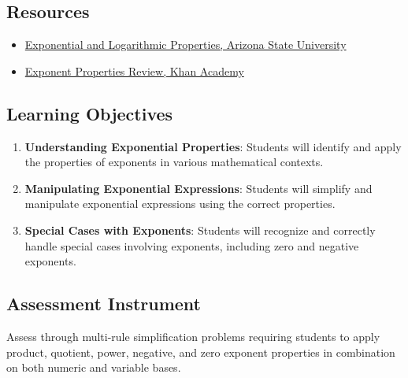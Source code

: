 \subsection{Resources}
\label{sss:reso-55b5}

\begin{itemize}
    \item \href{https://tutoring.asu.edu/sites/default/files/exponentialandlogrithmicproperties.pdf}{Exponential and Logarithmic Properties, Arizona State University}
    \item \href{https://www.khanacademy.org/math/cc-eighth-grade-math/cc-8th-numbers-operations/cc-8th-exponent-properties/a/exponent-properties-review}{Exponent Properties Review, Khan Academy}
\end{itemize}

\subsection{Learning Objectives}
\label{ssec:lear-29e5}

\begin{enumerate}
    \item \textbf{Understanding Exponential Properties}: Students will identify and apply the properties of exponents in various mathematical contexts.
    \item \textbf{Manipulating Exponential Expressions}: Students will simplify and manipulate exponential expressions using the correct properties.
    \item \textbf{Special Cases with Exponents}: Students will recognize and correctly handle special cases involving exponents, including zero and negative exponents.
\end{enumerate}

\subsection{Assessment Instrument}
\label{ssec:asse-0458}

Assess through multi-rule simplification problems requiring students to apply product,
quotient, power, negative, and zero exponent properties in combination on both numeric and
variable bases.

